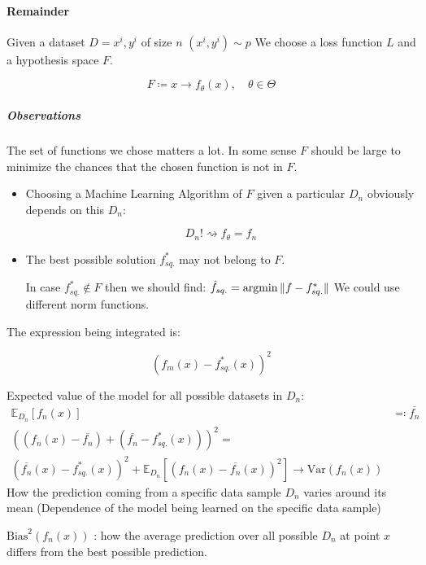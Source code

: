 \paragraph{Remainder}

Given a dataset \(D = {x^i, y^i}\) of size \(n\) \((x^i, y^i)\sim p\) We
choose a loss function \(L\) and a hypothesis space \(F\).

\[F \coloneqq { x \rightarrow f_\theta(x),\quad \theta \in \Theta }
\]

\subparagraph{Observations}

The set of functions we chose matters a lot. In some sense \(F\) should
be large to minimize the chances that the chosen function is not in
\(F\).

\begin{itemize}
	\item
	      Choosing a Machine Learning Algorithm of \(F\) given a particular
	      \(D_n\) obviously depends on this \(D_n\):

	      \[D_n! \rightsquigarrow f_\theta = f_n\]
	\item The best possible solution \(f^*_{sq.}\) may not belong to \(F\).

	      In case \(f^*_{sq.} \notin F\) then we should find:
	      \(\hat{f}_{sq.} = \operatorname{argmin} {\lVert f - f^*_{sq.} \rVert}\)
	      We could use different norm functions.
\end{itemize}

The expression being integrated is:

\[\left( f_m(x) - f^*_{sq.}(x) \right)^2
\]

Expected value of the model for all possible datasets in \(D_n\):
\begin{align*}
	\mathds{E}_{D_n} \left[ f_n(x) \right] & \eqqcolon \overline{f_n}                                               \\
	\left( \left( f_n(x) - \overline{f_n} \right) + \left( \overline{f_n} - f_{sq.}^*(x) \right) \right)^2 = \\
	\left( \overline{f_n}(x) - f_{sq.}^*(x) \right)^2 +
	\mathds{E}_{D_n} \left[ \left( f_n(x) - \overline{f_n}(x) \right)^2 \right]
	\rightarrow \text{Var}(f_n(x))
\end{align*}
How the prediction coming from a specific data sample $D_n$ varies around its mean
(Dependence of the model being learned on the specific data sample)

\(\text{Bias}^2(f_n(x))\) : how the average prediction over all possible
\(D_n\) at point \(x\) differs from the best possible prediction.

